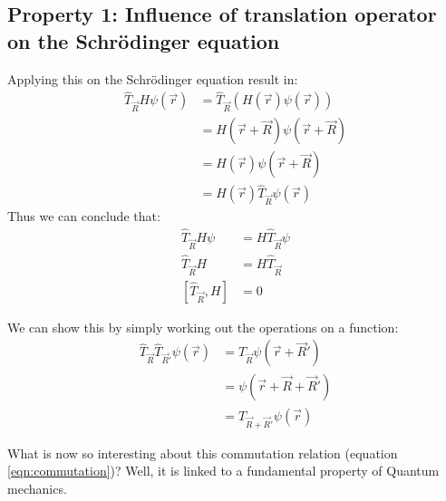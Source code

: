\begin{RECAP}
\section{Property 1: Influence of translation operator on the Schrödinger equation} \label{sec:property1}
Applying this on the Schrödinger equation result in:
\begin{align}
	\hat{T}_{\vec{R}}H\psi(\vec{r}) &= \hat{T}_{\vec{R}}(H(\vec{r})\psi(\vec{r}))\\
	&= H(\vec{r} + \vec{R})\psi(\vec{r} + \vec{R})\\
	&= H(\vec{r})\psi(\vec{r} + \vec{R})\\
	&= H(\vec{r})\hat{T}_{\vec{R}}\psi(\vec{r})
\end{align}
Thus we can conclude that:
\begin{align}
	\hat{T}_{\vec{R}}H\psi &= H\hat{T}_{\vec{R}}\psi \\
	\hat{T}_{\vec{R}}H &= H\hat{T}_{\vec{R}} \\
	\left[\hat{T}_{\vec{R}}, H\right] &= 0 \label{eqn:commutation}
\end{align}
\begin{myproof}
	We can show this by simply working out the operations on a function:
	\begin{align}
		\hat{T}_{\vec{R}}\hat{T}_{\vec{R}'}\psi(\vec{r}) &= \hat{T}_{\vec{R}}\psi(\vec{r} + \vec{R}') \\
		&= \psi(\vec{r} + \vec{R} + \vec{R}') \\
		&= \hat{T}_{\vec{R} + \vec{R}'}\psi(\vec{r})
	\end{align}
\end{myproof}
What is now so interesting about this commutation relation (equation \ref{eqn:commutation})? Well, it is linked to a fundamental property of Quantum mechanics.
\end{RECAP}
